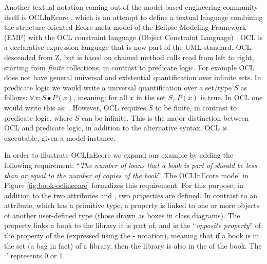 Another textual notation coming out of the model-based engineering community itself is OCLInEcore \cite{oclinecore}, 
which is an attempt 
to define a textual language combining the structure oriented 
Ecore meta-model
of the Eclipse Modeling Framework (EMF)
\cite{emf} with the 
OCL constraint language (Object Constraint 
Language) 
\cite{ocl}. OCL is a declarative expression language that is now 
part of the UML 
standard. OCL descended from Z, but is based on chained method 
calls read from left to right, starting from {\em finite} 
collections, in contrast to predicate logic. For example OCL does 
not have general universal and existential quantification over 
infinite sets. In predicate 
logic we would write a universal quantification over a set/type 
$S$ as follows: $\forall x : S \bullet P(x)$, meaning: for all $x$ 
in the set $S$, $P(x)$ is true. In OCL one would 
write this as:
. However, OCL requires $S$ to be 
finite,
in contrast to predicate logic, where $S$ can be infinite. This
is the major distinction between OCL and predicate logic, in 
addition to the alternative syntax. OCL is executable, given
a model instance.



%   

In order to illustrate OCLInEcore we expand our example by adding 
the following requirement: ``{\em The number of loans that a book 
is part of should be less than or equal to the 
number of copies of the book}''. The OCLInEcore model 
in Figure \ref{fig:book-oclinecore} formalizes this requirement.
For this purpose, in addition to the two attributes  and , two {\em properties} are defined. 
In contrast to an attribute, 
which has a primitive type, a property is linked to one or 
more objects of another user-defined 
type (those drawn as boxes in class diagrams).
The property  links a book to the library it is part 
of, and is the ``{\em opposite property}'' of the  
property of the  (expressed using the \iocl{#}-
notation), meaning that if a book is in the  set (a 
bag in fact) of a library, then the library is also in the 
 of the book. The `' represents 0 or 1.


